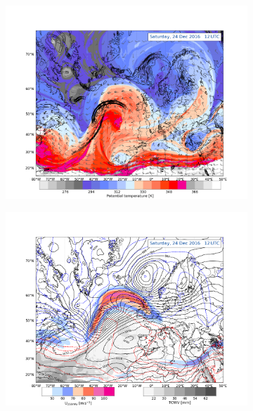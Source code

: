 \begin{figure}\ContinuedFloat
	\centering
	\begin{subfigure}[b]{0.49\textwidth}
		\includegraphics[trim={4.2cm 0cm 4.3cm 5.1cm},clip,
		width=\textwidth]{./fig_DynTropo/20161224_12}
		\caption{} \label{fig:DT24}
	\end{subfigure}
	\begin{subfigure}[b]{0.49\textwidth}
		\includegraphics[trim={4.2cm 0cm 4.3cm 5.1cm},clip,
		width=\textwidth]{./fig_Geopot_Jet/20161224_12}
		\caption{} \label{fig:GP24}
	\end{subfigure}

\end{figure}
